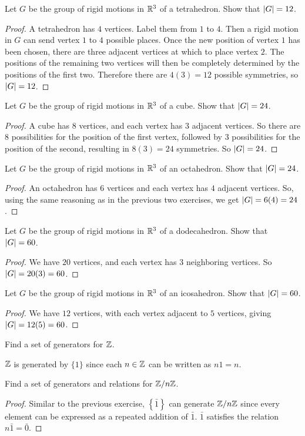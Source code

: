  Let $G$ be the group of rigid motions in $\mathbb{R}^3$ of a
tetrahedron. Show that $\lvert{G}\rvert = 12$.
\begin{proof}
  A tetrahedron has $4$ vertices. Label them from $1$ to $4$. Then a
  rigid motion in $G$ can send vertex $1$ to $4$ possible places. Once
  the new position of vertex $1$ has been chosen, there are three
  adjacent vertices at which to place vertex $2$. The positions of the
  remaining two vertices will then be completely determined by the
  positions of the first two. Therefore there are $4(3) = 12$ possible
  symmetries, so $\lvert{G}\rvert = 12$.
\end{proof}

 Let $G$ be the group of rigid motions in $\mathbb{R}^3$ of a
cube. Show that $\lvert{G}\rvert = 24$.
\begin{proof}
  A cube has $8$ vertices, and each vertex has $3$ adjacent
  vertices. So there are $8$ possibilities for the position of the
  first vertex, followed by $3$ possibilities for the position of the
  second, resulting in $8(3) = 24$ symmetries. So $\lvert{G}\rvert = 24$.
\end{proof}

 Let $G$ be the group of rigid motions in $\mathbb{R}^3$ of an
octahedron. Show that $\lvert{G}\rvert = 24$.
\begin{proof}
  An octahedron has $6$ vertices and each vertex has $4$ adjacent
  vertices. So, using the same reasoning as in the previous two
  exercises, we get $\lvert{G}\rvert = 6(4) = 24$.
\end{proof}

 Let $G$ be the group of rigid motions in $\mathbb{R}^3$ of a
dodecahedron. Show that $\lvert{G}\rvert = 60$.
\begin{proof}
  We have $20$ vertices, and each vertex has $3$ neighboring
  vertices. So $\lvert{G}\rvert = 20(3) = 60$.
\end{proof}

 Let $G$ be the group of rigid motions in $\mathbb{R}^3$ of an
icosahedron. Show that $\lvert{G}\rvert = 60$.
\begin{proof}
  We have $12$ vertices, with each vertex adjacent to $5$ vertices,
  giving $\lvert{G}\rvert = 12(5) = 60$.
\end{proof}

 Find a set of generators for $\mathbb{Z}$.
\begin{solution}
  $\mathbb{Z}$ is generated by $\{1\}$ since each $n\in\mathbb{Z}$ can be written as
  $n1 = n$.
\end{solution}

 Find a set of generators and relations for $\mathbb{Z}/n\mathbb{Z}$.
\begin{proof}
  Similar to the previous exercise, $\left\{\bar1\right\}$ can
  generate $\mathbb{Z}/n\mathbb{Z}$ since every element can be expressed as a repeated
  addition of $\bar1$. $\bar1$ satisfies the relation
  $n\bar1 = \bar0$.
\end{proof}
